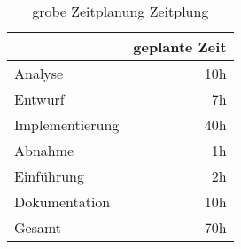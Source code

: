 \begin{table}[h]
\centering
\begin{tabular}{lr}
\rowcolor{gragreen}\multicolumn{1}{l}{\bf{Projektphase}}  & \multicolumn{1}{l}{\bf{geplante Zeit}} \\
\hline
Analyse   & 10h \\

\rowcolor{odd}Entwurf   & 7h \\

Implementierung  &  40h \\

\rowcolor{odd}Abnahme &   1h \\
Einführung   & 2h \\
\rowcolor{odd}Dokumentation   & 10h \\

\hline
\rowcolor{heading}Gesamt  & 70h
\end{tabular}
\caption{grobe Zeitplanung Zeitplung}
\label{table:overviewtimetable}
\end{table}